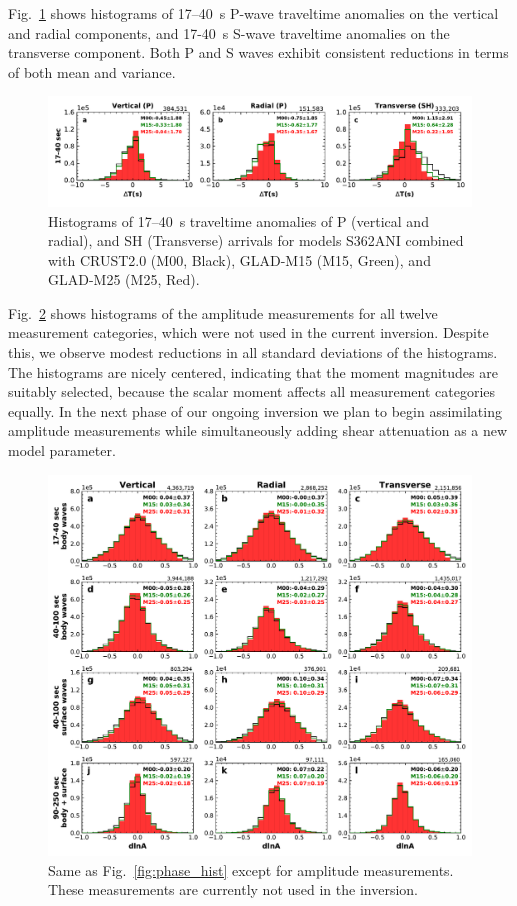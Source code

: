 Fig.~\ref{fig:PS_phase_hist} shows histograms of 17--40~s P-wave traveltime anomalies on the vertical and radial components, and 17-40~s S-wave traveltime anomalies on the transverse component.
Both P and S waves exhibit consistent reductions in terms of both mean and variance. 

\begin{figure}
  \centering
  \includegraphics[width=\textwidth]{ch-GLADM25/figures/dt_histogram_phase.pdf}
  \caption{\small{Histograms of 17--40~s traveltime anomalies of P (vertical and radial), and SH (Transverse) arrivals for models S362ANI combined with CRUST2.0 (M00, Black), GLAD-M15 (M15, Green), and GLAD-M25 (M25, Red).
  }}
  \label{fig:PS_phase_hist}
\end{figure}

Fig.~\ref{fig:amp_hist} shows histograms of the amplitude
measurements for all twelve measurement categories,
which were not used in the current inversion.
Despite this,
we observe modest reductions in all standard deviations of the histograms.
The histograms are nicely centered, indicating that the moment magnitudes are
suitably selected, because the scalar moment affects all measurement categories equally.
In the next phase of our ongoing inversion we plan to begin assimilating amplitude measurements while simultaneously adding shear attenuation as a new model parameter.

\begin{figure}
  \centering
  \includegraphics[width=\textwidth]{ch-GLADM25/figures/dlna_histogram.pdf}
  \caption{\small{Same as Fig.~\ref{fig:phase_hist} except for amplitude measurements. These measurements are currently not used in the inversion.}}
  \label{fig:amp_hist}
\end{figure}

